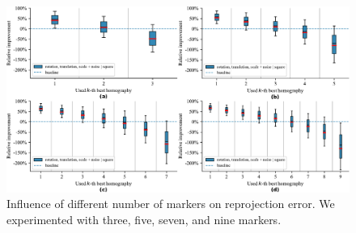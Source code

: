 \begin{figure}[t]
    \centering
    \includegraphics[width=\linewidth]{figures/homography/n_markers_influence.pdf}
    \caption[Influence of number of markers]{Influence of different number of markers on reprojection error. We experimented with  three,  five,  seven, and  nine markers.}
    \label{fig:NMarkersInfluence}
\end{figure}

